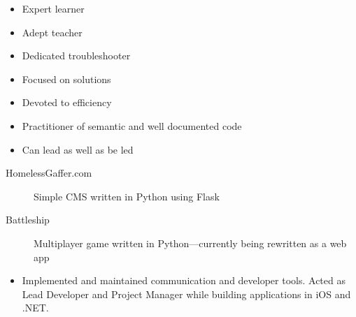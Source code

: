 \documentclass[letterpaper]{article}        %
\begin{document}
\begin{multicols}{3}
      \begin{itemize}
            \end{itemize}
    
      \begin{itemize}
        \item Expert learner
        \item Adept teacher
        \item Dedicated troubleshooter
        \item Focused on solutions
        \item Devoted to efficiency
        \item Practitioner of semantic and well documented code
        \item Can lead as well as be led
        \end{itemize}
    
    
  \end{multicols}


  \begin{description}
    \item[HomelessGaffer.com] Simple CMS written in Python using Flask
    \item[Battleship] Multiplayer game written in Python---currently being rewritten as a web app
    
  \end{description}


  
    \begin{itemize}
    \item Implemented and maintained communication and developer tools.  Acted as Lead Developer and Project Manager while building applications in iOS and .NET.
    \end{itemize}
  
\end{document}
